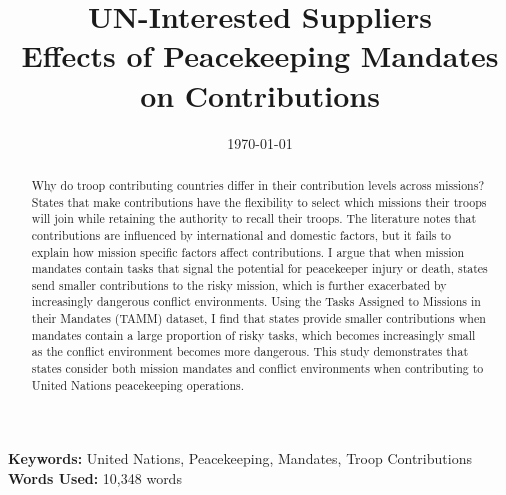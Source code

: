 \documentclass[12pt]{article}
\title{UN-Interested Suppliers \\
\large Effects of Peacekeeping Mandates on Contributions}
\date{\today}
\begin{document}

\begin{titlingpage}
\maketitle
\begin{abstract}
\begin{singlespace}
Why do troop contributing countries differ in their contribution levels across missions? States that make contributions have the flexibility to select which missions their troops will join while retaining the authority to recall their troops. The literature notes that contributions are influenced by international and domestic factors, but it fails to explain how mission specific factors affect contributions. I argue that when mission mandates contain tasks that signal the potential for peacekeeper injury or death, states send smaller contributions to the risky mission, which is further exacerbated by increasingly dangerous conflict environments. Using the Tasks Assigned to Missions in their Mandates (TAMM) dataset, I find that states provide smaller contributions when mandates contain a large proportion of risky tasks, which becomes increasingly small as the conflict environment becomes more dangerous. This study demonstrates that states consider both mission mandates and conflict environments when contributing to United Nations peacekeeping operations.
\end{singlespace}
\end{abstract}
\begin{center}
\textbf{Keywords:} United Nations, Peacekeeping, Mandates, Troop Contributions \\
\textbf{Words Used:} 10,348 words
\end{center}
\end{titlingpage}

\newpage

\end{document}
